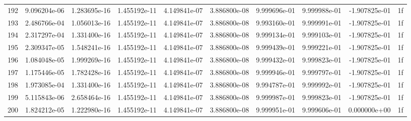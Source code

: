 \documentclass[10pt,aspectratio=1610]{beamer} %
\begin{document}
\begin{frame}
\begin{table}[htbp]
{\begin{tabular}{r r r r r r r r r c}
    192 & 9.096204e-06 & 1.283695e-16 & 1.455192e-11 & 4.149841e-07 & 3.886800e-08 & 9.999696e-01 & 9.999988e-01 & -1.907825e-01 & 1f \\
    193 & 2.486766e-04 & 1.056013e-16 & 1.455192e-11 & 4.149841e-07 & 3.886800e-08 & 9.993160e-01 & 9.999991e-01 & -1.907825e-01 & 1f \\
    194 & 2.317297e-04 & 1.331400e-16 & 1.455192e-11 & 4.149841e-07 & 3.886800e-08 & 9.999134e-01 & 9.999103e-01 & -1.907825e-01 & 1f \\
    195 & 2.309347e-05 & 1.548241e-16 & 1.455192e-11 & 4.149841e-07 & 3.886800e-08 & 9.999439e-01 & 9.999221e-01 & -1.907825e-01 & 1f \\
    196 & 1.084048e-05 & 1.999269e-16 & 1.455192e-11 & 4.149841e-07 & 3.886800e-08 & 9.999432e-01 & 9.999823e-01 & -1.907825e-01 & 1f \\
    197 & 1.175446e-05 & 1.782428e-16 & 1.455192e-11 & 4.149841e-07 & 3.886800e-08 & 9.999946e-01 & 9.999797e-01 & -1.907825e-01 & 1f \\
    198 & 1.973085e-04 & 1.331400e-16 & 1.455192e-11 & 4.149841e-07 & 3.886800e-08 & 9.994787e-01 & 9.999992e-01 & -1.907825e-01 & 1f \\
    199 & 5.115843e-06 & 2.658464e-16 & 1.455192e-11 & 4.149841e-07 & 3.886800e-08 & 9.999987e-01 & 9.999823e-01 & -1.907825e-01 & 1f \\
    200 & 1.824212e-05 & 1.222980e-16 & 1.455192e-11 & 4.149841e-07 & 3.886800e-08 & 9.999951e-01 & 9.999606e-01 & 0.000000e+00  & 1f \\
    \bottomrule
    \end{tabular}%
    }
    \label{tab:solver-log}
    \end{table}
\end{frame}
\end{document}
